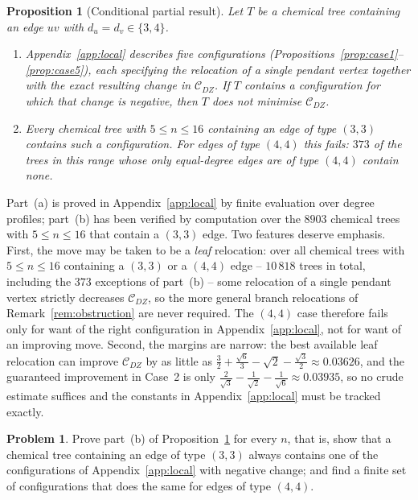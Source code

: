 \documentclass[11pt,a4paper]{article}
\theoremstyle{plain}
\newtheorem{proposition}[theorem]{Proposition}
\theoremstyle{definition}
\newtheorem{problem}[theorem]{Problem}
\theoremstyle{remark}
\newcommand{\CDZ}{\mathcal{C}_{DZ}}
\begin{document}
\begin{proposition}[Conditional partial result]
\label{prop:partialres}
Let $T$ be a chemical tree containing an edge $uv$ with $d_u=d_v\in\{3,4\}$.
\begin{enumerate}
\item[(a)] Appendix~\ref{app:local} describes five configurations
      (Propositions~\ref{prop:case1}--\ref{prop:case5}), each specifying the
      relocation of a single pendant vertex together with the exact resulting
      change in $\CDZ$. If $T$ contains a configuration for which that change is
      negative, then $T$ does not minimise $\CDZ$.
\item[(b)] Every chemical tree with $5\le n\le16$ containing an edge of type
      $(3,3)$ contains such a configuration. For edges of type $(4,4)$ this
      fails: $373$ of the trees in this range whose only equal-degree edges are
      of type $(4,4)$ contain none.
\end{enumerate}
\end{proposition}

Part~(a) is proved in Appendix~\ref{app:local} by finite evaluation over degree
profiles; part~(b) has been verified by computation over the $8903$ chemical
trees with $5\le n\le16$ that contain a $(3,3)$ edge. Two features deserve
emphasis. First, the move may be taken to be a \emph{leaf} relocation: over all
chemical trees with $5\le n\le16$ containing a $(3,3)$ or a $(4,4)$ edge --
$10\,818$ trees in total, including the $373$ exceptions of part~(b) -- some
relocation of a single pendant vertex strictly decreases $\CDZ$, so the more
general branch relocations of Remark~\ref{rem:obstruction} are never required.
The $(4,4)$ case therefore fails only for want of the right configuration in
Appendix~\ref{app:local}, not for want of an improving move. Second, the margins
are narrow: the best available leaf relocation can improve $\CDZ$ by as little
as $\tfrac32+\tfrac{\sqrt6}{3}-\sqrt2-\tfrac{\sqrt3}{2}\approx0.03626$, and the
guaranteed improvement in Case~2 is only
$\tfrac{2}{\sqrt3}-\tfrac{1}{\sqrt2}-\tfrac{1}{\sqrt6}\approx0.03935$, so no crude
estimate suffices and the constants in Appendix~\ref{app:local} must be tracked
exactly.

\begin{problem}
\label{prob:partial}
Prove part~(b) of Proposition~\ref{prop:partialres} for every $n$, that is, show
that a chemical tree containing an edge of type $(3,3)$ always contains one of
the configurations of Appendix~\ref{app:local} with negative change; and find a
finite set of configurations that does the same for edges of type $(4,4)$.
\end{problem}
\end{document}
